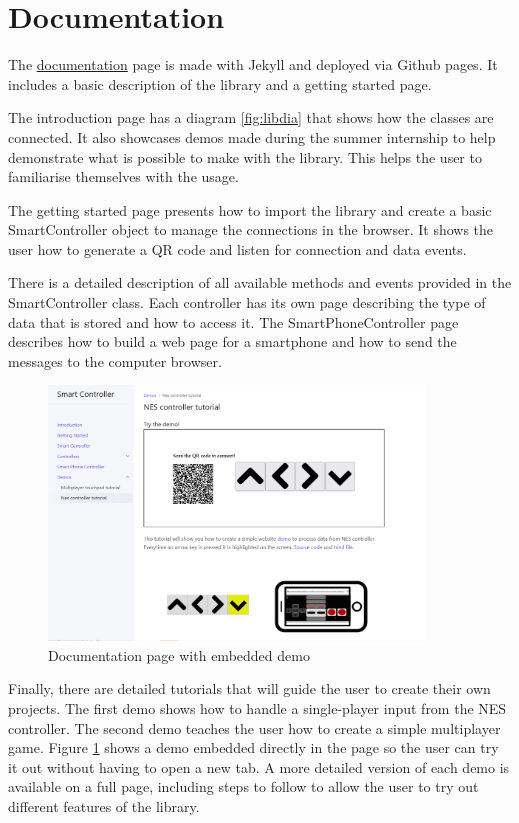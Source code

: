\documentclass{l4proj}
\begin{document}
\section{Documentation}
The \href{https://smartcontrollerjs.github.io/SmartController/}{documentation} page is made with Jekyll and deployed via Github pages. It includes a basic description of the library and a getting started page. \par
The introduction page has a diagram \ref{fig:libdia} that shows how the classes are connected. It also showcases demos made during the summer internship to help demonstrate what is possible to make with the library. This helps the user to familiarise themselves with the usage. \par
The getting started page presents how to import the library and create a basic SmartController object to manage the connections in the browser. It shows the user how to generate a QR code and listen for connection and data events.\par
There is a detailed description of all available methods and events provided in the SmartController class. Each controller has its own page describing the type of data that is stored and how to access it. The SmartPhoneController page describes how to build a web page for a smartphone and how to send the messages to the computer browser.\\

\begin{figure}[h!]
    \centering
    \includegraphics[width= 10cm]{./images/document.png}
    \caption{Documentation page with embedded demo}
    \label{fig:demo}
\end{figure}

Finally, there are detailed tutorials that will guide the user to create their own projects. The first demo shows how to handle a single-player input from the NES controller. The second demo teaches the user how to create a simple multiplayer game. 
Figure \ref{fig:demo} shows a demo embedded directly in the page so the user can try it out without having to open a new tab. A more detailed version of each demo is available on a full page, including steps to follow to allow the user to try out different features of the library.
\end{document}
